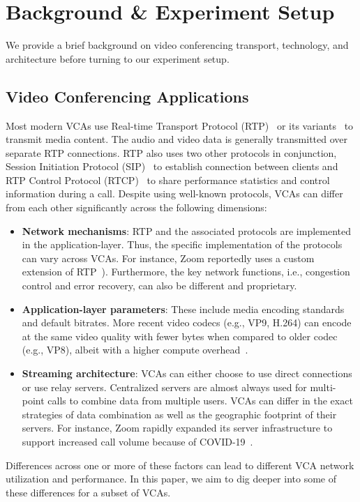 \section{Background \& Experiment Setup}
\label{sec:background}

We provide a brief background on video conferencing transport, technology, and
architecture before turning to our experiment setup.

\subsection{Video Conferencing Applications}

Most modern VCAs use Real-time Transport Protocol (RTP)~\cite{schulzrinne1996rtp,
schulzrinne2003rfc3550} or its variants~\cite{baugher2004secure, zoom_rtp} to
transmit media content. The audio and video data is generally transmitted over
separate RTP connections. RTP also uses two other protocols in conjunction,
Session Initiation Protocol (SIP)~\cite{rosenberg2002sip} to establish
connection between clients and RTP Control Protocol
(RTCP)~\cite{schulzrinne2003rfc3550} to share performance statistics and
control information during a call. Despite using well-known protocols, VCAs
can differ from each other significantly across the following dimensions:


\begin{itemize}
    \itemsep=-1pt
    \item \textbf{Network mechanisms}: RTP and the associated protocols are
        implemented in the application-layer. Thus, the specific
        implementation of the protocols can vary across VCAs. For instance,
        Zoom reportedly uses a custom extension of RTP~\cite{zoom_rtp}).
        Furthermore, the key network functions, i.e., congestion control and
        error recovery, can also be different and proprietary. 

    \item \textbf{Application-layer parameters}: These include media encoding
        standards and default bitrates. More recent video codecs (e.g., VP9,
        H.264) can encode at the same video quality with fewer bytes when
        compared to older codec (e.g., VP8), albeit with a higher compute
        overhead~\cite{bienik2016performance}. 
    
    \item \textbf{Streaming architecture}: VCAs can either choose to use
        direct connections or use relay servers. Centralized servers are
        almost always used for multi-point calls to combine data from multiple
        users. VCAs can differ in the exact strategies of data combination as
        well as the geographic footprint of their servers. For instance, Zoom
        rapidly expanded its server infrastructure to support increased call
        volume because of COVID-19~\cite{liu2020characterizing}. 

\end{itemize}
\noindent
Differences across one or more of these factors can lead to different VCA
network utilization and performance. In this paper, we aim to dig deeper into
some of these differences for a subset of VCAs. 


